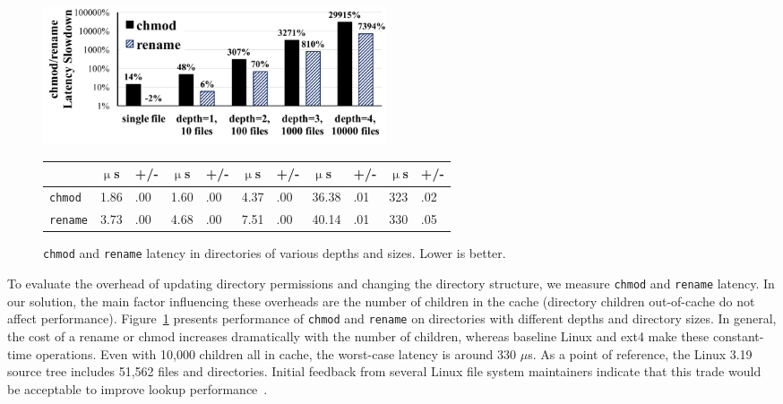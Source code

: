 \begin{figure}[t!]
\scriptsize
\centering
\begin{minipage}{4in}
\raggedleft
\includegraphics[width=4in]{dcache/plots/lm_chmod_rename.pdf}
{\setlength{\tabcolsep}{3pt}
\begin{tabular}{|l|R{.3in}R{.16in}|R{.3in}R{.16in}|R{.3in}R{.16in}|R{.3in}R{.16in}|R{.3in}R{.16in}|}
\hline
 & $\upmu$s & +/- & $\upmu$s & +/- & $\upmu$s & +/- & $\upmu$s & +/- & $\upmu$s & +/- \\
\hline
{\tt chmod}  & 1.86 & .00 & 1.60 & .00 & 4.37 & .00 & 36.38 & .01 & 323 & .02 \\
\hline
{\tt rename} & 3.73 & .00 & 4.68 & .00 & 7.51 & .00 & 40.14 & .01 & 330 & .05 \\
\hline
\end{tabular}}
\end{minipage}
\caption[Overhead of the {\tt chmod} and {\tt rename} latency in the optimized directory cache]
{{\tt chmod} and {\tt rename} latency in directories of various depths and sizes. Lower is better.}
\label{fig:dcache:chmod-rename}
\end{figure}

To evaluate the overhead of updating directory permissions and changing the directory structure,
we measure {\tt chmod} and {\tt rename} latency.
In our solution, the main factor influencing these overheads are the number of children
in the cache (directory children out-of-cache do not affect performance).
Figure~\ref{fig:dcache:chmod-rename} presents
performance of {\tt chmod} and {\tt rename}  on directories with different depths and directory sizes.
In general, the cost of a rename or chmod increases dramatically with the number of children,
whereas baseline Linux and ext4 make these constant-time operations.
Even with 10,000 children all in cache, the worst-case latency is around 330 $\mu$s.
As a point of reference, the Linux 3.19 source tree includes 51,562 files and directories.
Initial feedback from several Linux file system maintainers indicate that this trade would be acceptable
to improve lookup performance~\citep{linux-forum}.

